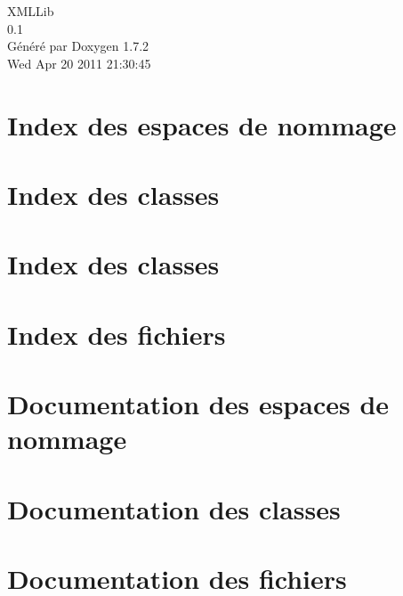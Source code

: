\documentclass[a4paper]{book}
\begin{document}
\hypersetup{pageanchor=false}
\begin{titlepage}
\vspace*{7cm}
\begin{center}
{\Large XMLLib \\[1ex]\large 0.1 }\\
\vspace*{1cm}
{\large Généré par Doxygen 1.7.2}\\
\vspace*{0.5cm}
{\small Wed Apr 20 2011 21:30:45}\\
\end{center}
\end{titlepage}
\clearemptydoublepage
{}
\tableofcontents
\clearemptydoublepage
{}
\hypersetup{pageanchor=true}
\chapter{Index des espaces de nommage}

\chapter{Index des classes}

\chapter{Index des classes}

\chapter{Index des fichiers}

\chapter{Documentation des espaces de nommage}

\chapter{Documentation des classes}







\chapter{Documentation des fichiers}













\printindex
\end{document}
